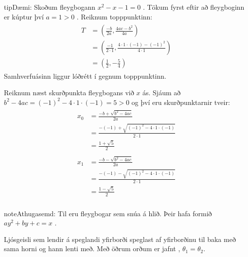 \documentclass[a4paper,10pt,icelandic]{sphinxmanual}
\begin{document}
\begin{sphinxadmonition}{tip}{Dæmi:}
Skoðum fleygbogann \(x^2-x-1=0\) .
Tökum fyrst eftir að fleygboginn er kúptur því \(a=1>0\) .
Reiknum topppunktinn:
\begin{equation*}
\begin{split}\begin{aligned}
  T&=\left(\frac{-b}{2a},\frac{4ac-b^2}{4a} \right) \\
  &= \left(\frac{-1}{2\cdot 1},\frac{4\cdot 1\cdot (-1)-(-1)^2}{4\cdot 1} \right) \\
  &= \left(\frac{1}{2},-\frac{5}{4} \right)
\end{aligned}\end{split}
\end{equation*}
Samhverfuásinn liggur lóðrétt í gegnum topppunktinn.

Reiknum næst skurðpunkta fleygbogans við \(x\) \sphinxhyphen{}ás.
Sjáum að \(b^2-4ac=(-1)^2-4\cdot1\cdot(-1) = 5 >0\) og því eru skurðpunktarnir tveir:
\begin{equation*}
\begin{split}\begin{aligned}
            x_0 &= \frac{-b+ \sqrt{b^2-4ac}}{2a} \\
            &= \frac{-(-1)+ \sqrt{(-1)^2-4\cdot 1\cdot(-1)}}{2\cdot 1} \\
            &= \frac{1+\sqrt{5}}{2}\\
            \\
            x_1 &= \frac{-b- \sqrt{b^2-4ac}}{2a} \\
            &= \frac{-(-1)- \sqrt{(-1)^2-4\cdot 1\cdot(-1)}}{2\cdot 1} \\
            &= \frac{1-\sqrt{5}}{2} \\
\end{aligned}\end{split}
\end{equation*}
\begin{figure}[H]
\centering

\noindent{}
\end{figure}
\end{sphinxadmonition}

\begin{sphinxadmonition}{note}{Athugasemd:}
Til eru fleygbogar sem snúa á hlið.
Þeir hafa formið \(ay^2+by+c=x\) .
\end{sphinxadmonition}

Ljósgeisli sem lendir á speglandi yfirborði speglast af yfirborðinu til baka með sama horni og hann lenti með.
Með öðrum orðum er  jafnt , \(\theta_1=\theta_2\).
\end{document}
